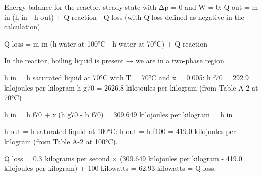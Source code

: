 Energy balance for the reactor, steady state with Δp = 0 and W = 0:  
Q out = m in (h in - h out) + Q reaction - Q loss  
(with Q loss defined as negative in the calculation).  

Q loss = m in (h water at 100°C - h water at 70°C) + Q reaction  

In the reactor, boiling liquid is present → we are in a two-phase region.  

h in = h saturated liquid at 70°C with T = 70°C and x = 0.005:  
h f70 = 292.9 kilojoules per kilogram  
h g70 = 2626.8 kilojoules per kilogram (from Table A-2 at 70°C)  

h in = h f70 + x (h g70 - h f70) = 309.649 kilojoules per kilogram = h in  

h out = h saturated liquid at 100°C:  
h out = h f100 = 419.0 kilojoules per kilogram (from Table A-2 at 100°C).  

Q loss = 0.3 kilograms per second × (309.649 kilojoules per kilogram - 419.0 kilojoules per kilogram) + 100 kilowatts = 62.93 kilowatts = Q loss.